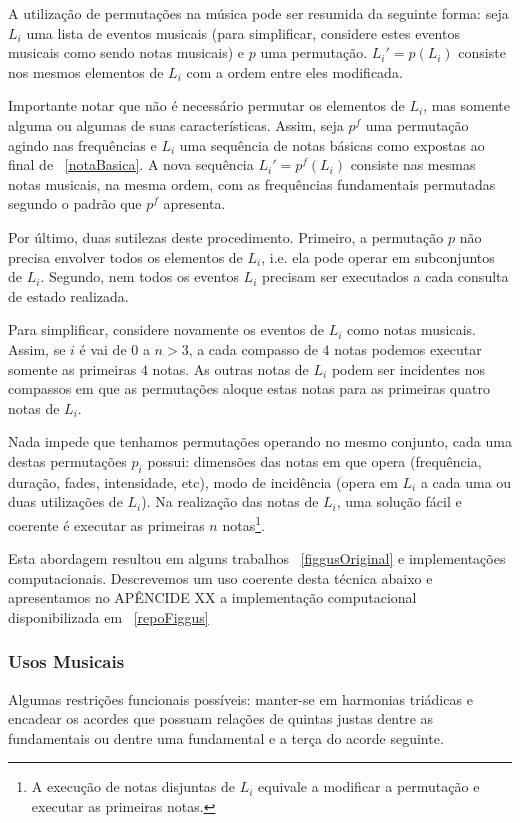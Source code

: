 A utilização de permutações na música pode ser resumida da seguinte forma:
seja $L_i$ uma lista de eventos musicais (para simplificar, considere
estes eventos musicais como sendo notas musicais) e $p$ uma permutação.
$L_i'=p(L_i)$ consiste nos mesmos elementos de $L_i$ com a ordem entre eles
modificada.

Importante notar que não é necessário permutar os elementos de $L_i$, mas somente
alguma ou algumas de suas características. Assim, seja $p^f$ uma permutação agindo
nas frequências e $L_i$ uma sequência de notas básicas como expostas
ao final de ~\ref{notaBasica}. A nova sequência $L_i'=p^f(L_i)$ consiste nas mesmas
notas musicais, na mesma ordem, com as frequências fundamentais permutadas segundo
o padrão que $p^f$ apresenta.

Por último, duas sutilezas deste procedimento.
Primeiro, a permutação $p$ não precisa envolver todos os elementos de $L_i$, i.e. ela
pode operar em subconjuntos de $L_i$. Segundo, nem todos os eventos $L_i$ precisam ser executados a
cada consulta de estado realizada.

Para simplificar, considere novamente os eventos de $L_i$ 
como notas musicais. Assim, se $i$ é vai de $0$ a $n>3$, a cada compasso
de $4$ notas podemos executar somente as primeiras $4$ notas. As outras notas de
$L_i$ podem ser incidentes nos compassos em que as permutações aloque
estas notas para as primeiras quatro notas de $L_i$.

Nada impede que tenhamos permutações operando no mesmo conjunto, cada uma destas permutações
$p_i$
possui: dimensões das notas em que opera (frequência, duração, fades, intensidade, etc),
modo de incidência (opera em $L_i$ a cada uma ou duas utilizações de $L_i$). Na realização das notas de $L_i$, uma solução fácil e coerente é executar as primeiras $n$ notas\footnote{A execução de notas disjuntas de $L_i$ equivale a modificar a permutação e executar as primeiras notas.}.

Esta abordagem resultou em alguns trabalhos ~\ref{figgusOriginal} e implementações computacionais. Descrevemos um uso coerente desta técnica abaixo e apresentamos no APÊNCIDE XX a implementação computacional disponibilizada em ~\ref{repoFiggus}


\subsubsection{Usos Musicais}
Algumas restrições funcionais possíveis: manter-se em harmonias triádicas e encadear os acordes
que possuam relações de quintas justas dentre as fundamentais ou dentre uma fundamental
e a terça do acorde seguinte.

